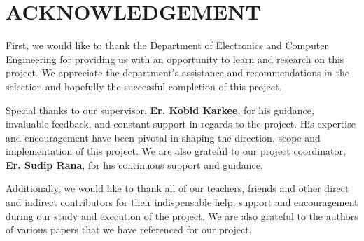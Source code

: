 \chapter*{ACKNOWLEDGEMENT}
{}

First, we would like to thank the Department of Electronics and Computer Engineering
for providing us with an opportunity to learn and research on this project. We appreciate
the department’s assistance and recommendations in the selection and hopefully the
successful completion of this project.

Special thanks to our supervisor, \textbf{Er. Kobid Karkee}, for his guidance, invaluable
feedback, and constant support in regards to the project. His expertise and
encouragement have been pivotal in shaping the direction, scope and implementation
of this project. We are also grateful to our project coordinator, \textbf{Er. Sudip Rana}, for his
continuous support and guidance.

Additionally, we would like to thank all of our teachers, friends and other direct and
indirect contributors for their indispensable help, support and encouragement during
our study and execution of the project. We are also grateful to the authors of various
papers that we have referenced for our project.

\vspace{1em}
\noindent \authorTable